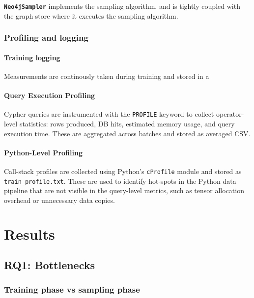 \documentclass[ oneside,openright,titlepage,numbers=noenddot,headinclude,%
                footinclude=true,cleardoublepage=empty,abstractoff, %
                BCOR=0mm,paper=a4,fontsize=11pt,%
                ngerman,american,%
                ]{scrreprt}
\begin{document}
\noindent \textbf{\texttt{Neo4jSampler}} implements the sampling algorithm, and is tightly coupled
with the graph store where it executes the sampling algorithm.


\subsection{Profiling and logging}

\subsubsection{Training logging}
Measurements are continously taken during training and stored in a 

\subsubsection{Query Execution Profiling}\label{sec:query_profiling}

Cypher queries are instrumented with the \texttt{PROFILE} keyword to collect
operator-level statistics: rows produced, {DB} hits, estimated memory
usage, and query execution time. These are aggregated across batches and stored as averaged {CSV}.

\subsubsection{Python-Level Profiling}\label{sec:python_profiling}

Call-stack profiles are collected using Python's \texttt{cProfile} module and stored
as \texttt{train\_profile.txt}. These are used to identify hot-spots in the Python
data pipeline that are not visible in the query-level metrics, such as tensor
allocation overhead or unnecessary data copies.


\chapter{Results}

\section{RQ1: Bottlenecks}
\subsection{Training phase vs sampling phase}
\end{document}
